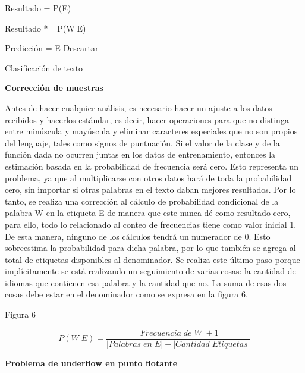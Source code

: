 \documentclass[sigconf]{acmart}
\begin{document}
\begin{algorithm}[H]
\SetAlgoLined
{}
 {
        Resultado = P(E)
    
     {
            Resultado *= P(W|E)
     }
     
    {
        Predicción = E
   }
   {
   Descartar
   }
 }
 
 \caption{Clasificación de texto}
\end{algorithm}

\textbf{Corrección de muestras}

Antes de hacer cualquier análisis, es necesario hacer un ajuste a los datos recibidos y hacerlos estándar, es decir, hacer operaciones para que no distinga entre minúscula y mayúscula y eliminar caracteres especiales que no son propios del lenguaje, tales como signos de puntuación. Si el valor de la clase y de la función dada no ocurren juntas en los datos de entrenamiento, entonces la estimación basada en la probabilidad de frecuencia será cero. Esto representa un problema, ya que al multiplicarse con otros datos hará de toda la probabilidad cero, sin importar si otras palabras en el texto daban mejores resultados. Por lo tanto, se realiza una corrección al cálculo de probabilidad condicional de la palabra W en la etiqueta E de manera que este nunca dé como resultado cero, para ello, todo lo relacionado al conteo de frecuencias tiene como valor inicial 1. De esta manera, ninguno de los cálculos tendrá un numerador de 0. Esto sobreestima la probabilidad para dicha palabra, por lo que también se agrega al total de etiquetas disponibles al denominador. Se realiza este último paso porque implícitamente se está realizando un seguimiento de varias cosas: la cantidad de idiomas que contienen esa palabra y la cantidad que no. La suma de esas dos cosas debe estar en el denominador como se expresa en la figura 6.\citep{Apd}

Figura 6

\begin{equation}
\label{eq:bayes5}
P(W|E) = \frac {|Frecuencia\;de\;W| + 1} {|Palabras\;en\;E| + |Cantidad\;Etiquetas|}
\end{equation}

\textbf{Problema de underflow en punto flotante}
\end{document}
